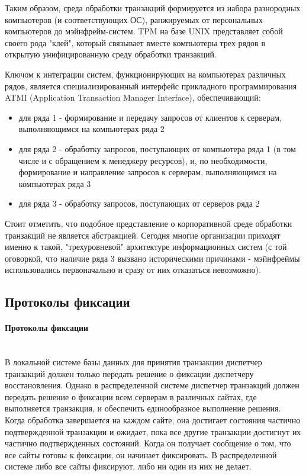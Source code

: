 Таким образом, среда обработки транзакций формируется из набора разнородных компьютеров (и соответствующих ОС),
ранжируемых от персональных компьютеров до мэйнфрейм-систем. TPM на базе UNIX представляет собой своего
рода "клей", который связывает вместе компьютеры трех рядов в открытую унифицированную среду обработки транзакций.

Ключом к интеграции систем, функционирующих на компьютерах различных рядов, является специализированный
интерфейс прикладного программирования ATMI (Application Transaction Manager Interface), обеспечивающий:
\begin{itemize}
    \item для ряда 1 - формирование и передачу запросов от клиентов к серверам, выполняющимся на компьютерах ряда 2
    \item для ряда 2 - обработку запросов, поступающих от компьютера ряда 1 (в том числе и с обращением к менеджеру ресурсов), и, по необходимости, формирование и направление запросов к серверам, выполняющимся на компьютерах ряда 3
    \item для ряда 3 - обработку запросов, поступающих от серверов ряда 2
\end{itemize}

Стоит отметить, что подобное представление о корпоративной среде обработки транзакций не является абстракцией.
Сегодня многие организации приходят именно к такой, "трехуровневой" архитектуре информационных
систем (с той оговоркой, что наличие ряда 3 вызвано историческими причинами - мэйнфреймы использовались
первоначально и сразу от них отказаться невозможно).

\subsection{Протоколы фиксации}
\paragraph{Протоколы фиксации}~\\

В локальной системе базы данных для принятия транзакции диспетчер транзакций должен только передать решение
о фиксации диспетчеру восстановления. Однако в распределенной системе диспетчер транзакций должен передать
решение о фиксации всем серверам в различных сайтах, где выполняется транзакция, и обеспечить
единообразное выполнение решения. Когда обработка завершается на каждом сайте, она достигает состояния
частично подтвержденной транзакции и ожидает, пока все другие транзакции достигнут их частично подтвержденных состояний.
Когда он получает сообщение о том, что все сайты готовы к фиксации, он начинает фиксировать.
В распределенной системе либо все сайты фиксируют, либо ни один из них не делает.

